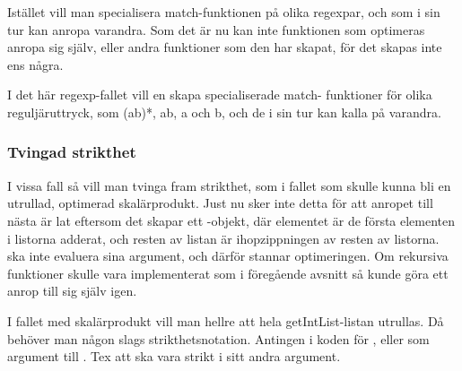 \documentclass[Rapport]{subfiles}
\begin{document}
    Istället vill man specialisera match-funktionen på olika regexpar, och
som i sin tur kan anropa varandra. Som det är nu kan inte funktionen som
optimeras anropa sig själv, eller andra funktioner som den har skapat,
för det skapas inte ens några.

    I det här regexp-fallet vill en skapa specialiserade match-
funktioner för olika reguljäruttryck, som (ab)*, ab, a och b, och de i sin tur
kan kalla på varandra.

\subsubsection{Tvingad strikthet}

I vissa fall så vill man tvinga fram strikthet, som i fallet 
 som skulle kunna bli en utrullad,
optimerad skalärprodukt. Just nu sker inte detta för att anropet till nästa
 är lat eftersom det skapar ett -objekt, där elementet är de första
elementen i listorna adderat, och resten av listan är ihopzippningen av resten
av listorna.  ska inte evaluera sina argument, och därför stannar
optimeringen. Om rekursiva funktioner skulle vara implementerat som i föregående
avsnitt så kunde göra ett anrop till sig själv igen.

    I fallet med skalärprodukt vill man hellre att hela getIntList-listan 
utrullas. Då behöver man någon slags strikthetsnotation. Antingen i koden 
för , eller som argument till . Tex att  ska vara strikt i 
sitt andra argument.
\end{document}
